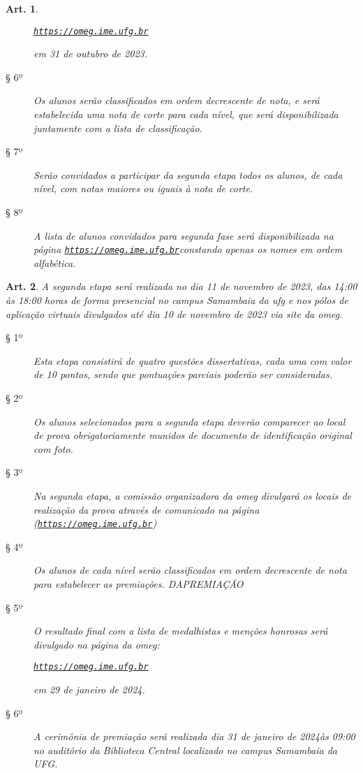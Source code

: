 \documentclass[a4paper,12pt]{article}
\newtheorem{article}{Art.}
\def\url{https://omeg.ime.ufg.br}
\def\homepage{\href{\url}{\texttt{\url}}}
\def\year{2023}
\def\phaseTwo{11 de novembro de \year}
\def\remoteBasesDisclosureDate{10 de novembro de \year}
\def\resultsFromPhaseOne{31 de outubro de \year}
\def\resultsFromPhaseTwo{29 de janeiro de 2024}
\def\prizesDay{31 de janeiro de 2024}
\begin{document}
\begin{article}
\begin{description}
\begin{center}
        \homepage
      \end{center}
      em \resultsFromPhaseOne.
    \item[§ 6º]
      Os alunos serão classificados em ordem decrescente de nota, e será
      estabelecida uma nota de corte para cada nível, que será disponibilizada
      juntamente com a lista de classificação.
    \item[§ 7º]
      Serão convidados a participar da segunda etapa todos os alunos, de cada
      nível, com notas maiores ou iguais à nota de corte.
    \item[§ 8º]
      A lista de alunos convidados para segunda fase será disponibilizada na
      página \homepage constando apenas os nomes em ordem
      alfabética.
  \end{description}
\end{article}

\begin{article}
  A segunda etapa será realizada no dia \phaseTwo, das 14:00 às 18:00 horas
  de forma presencial no campus Samambaia da \acrshort{ufg} e nos pólos de
  aplicação virtuais divulgados até dia \remoteBasesDisclosureDate{} via site
  da \acrshort{omeg}.
  \begin{description}
    \item[§ 1º]
      Esta etapa consistirá de quatro questões dissertativas, cada uma com
      valor de 10 pontos, sendo que pontuações parciais poderão ser
      consideradas.
    \item[§ 2º]
      Os alunos selecionados para a segunda etapa deverão comparecer ao
      local de prova obrigatoriamente munidos de documento de identificação
      original com foto.
    \item[§ 3º]
      Na segunda etapa, a comissão organizadora da \acrshort{omeg} divulgará os
      locais de realização da prova através de comunicado na página
      (\homepage)
    \item[§ 4º]
      Os alunos de cada nível serão classificados em ordem decrescente de
      nota para estabelecer as premiações.
      DAPREMIAÇÃO
    \item[§ 5º]
      O resultado final com a lista de medalhistas e menções honrosas será
      divulgado na página da \acrshort{omeg}:
      \begin{center}
        \homepage
      \end{center}
      em \resultsFromPhaseTwo.
    \item[§ 6º]
      A cerimônia de premiação será realizada dia \prizesDay às 09:00 no
      auditório da Biblioteca Central localizado no campus Samambaia da UFG.
  \end{description}
\end{article}
\end{document}
